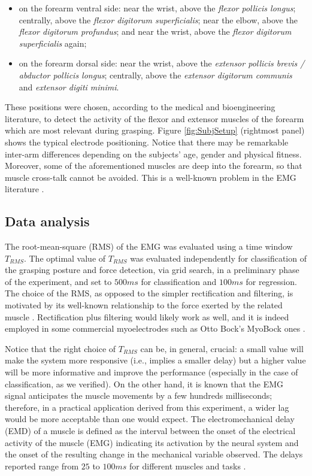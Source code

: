 \documentclass[10pt]{bmc_article}
\newenvironment{bmcformat}
  {\begin{raggedright}\baselineskip20pt\sloppy\setboolean{publ}{false}}
  {\end{raggedright}\baselineskip20pt\sloppy}
\begin{document}
\begin{bmcformat}
\begin{itemize}
  \item on the forearm ventral side: near the wrist, above the
    \emph{flexor pollicis longus}; centrally, above the \emph{flexor
    digitorum superficialis}; near the elbow, above the \emph{flexor
    digitorum profundus}; and near the wrist, above the \emph{flexor
    digitorum superficialis} again;

  \item on the forearm dorsal side: near the wrist, above the
    \emph{extensor pollicis brevis / abductor pollicis longus};
    centrally, above the \emph{extensor digitorum communis} and
    \emph{extensor digiti minimi}.

\end{itemize}

These positions were chosen, according to the medical \cite{Kendall} and
bioengineering \cite{kampas} literature, to detect the activity of the flexor
and extensor muscles of the forearm which are most relevant during grasping.
Figure \ref{fig:SubjSetup} (rightmost panel) shows
the typical electrode positioning. Notice that there may be remarkable
inter-arm differences depending on the subjects' age, gender and physical
fitness. Moreover, some of the aforementioned muscles are deep into
the forearm, so that muscle cross-talk cannot be avoided. This is a
well-known problem in the EMG literature \cite{deluca97,zecca}.

\subsection*{Data analysis}

The root-mean-square (RMS) of the EMG was evaluated using a time window
$T_{RMS}$. The optimal value
of $T_{RMS}$ was evaluated independently for classification of the grasping
posture and force detection, via grid search, in a preliminary phase of the
experiment, and set to $500ms$ for classification and $100ms$ for regression.
The choice of the RMS, as opposed
to the simpler rectification and filtering,
is motivated by its well-known relationship to the force exerted
by the related muscle \cite{deluca97,deluca02,zecca}. Rectification plus filtering
would likely work as well, and it is indeed employed in some commercial myoelectrodes
such as Otto Bock's MyoBock ones \cite{ottobock}.

Notice that the right choice of $T_{RMS}$ can be, in general,
crucial: a small value will make the system more responsive (i.e., implies
a smaller delay) but a higher value will be more informative and improve the
performance (especially in the case of classification, as we verified).
On the other hand, it is known that the EMG signal anticipates the muscle
movements by a few hundreds milliseconds; therefore, in a practical application derived from this
experiment, a wider lag would be more acceptable than one would expect.
The electromechanical delay (EMD) of a muscle is defined as the interval
between the onset of the electrical activity of the muscle (EMG)
indicating its activation by the neural system and the onset of the
resulting change in the mechanical variable observed. The delays
reported range from $25$ to $100ms$ for different muscles and tasks
\cite{Wolf1994}.


\end{bmcformat}
\end{document}
